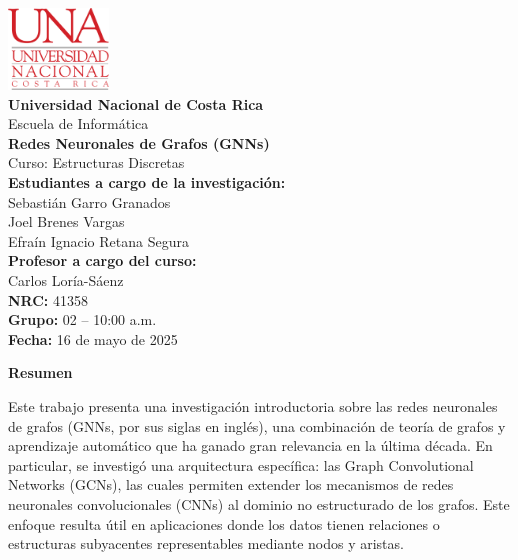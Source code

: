 \documentclass[11pt]{article} %
\begin{document}
\begin{titlepage}
    \thispagestyle{empty}
    \begin{spacing}{1.5}
    \begin{center}
        \includegraphics[width=0.2\textwidth]{Images/LogoUNA.svg.png} \\[30pt]
        {\Large \textbf{Universidad Nacional de Costa Rica}} \\[20pt] 
        {\Large Escuela de Informática} \\[20pt]
        {\Large \textbf{Redes Neuronales de Grafos (GNNs)}} \\[20pt]
        {\Large Curso: Estructuras Discretas} \\[20pt]
        
        {\Large \textbf{Estudiantes a cargo de la investigación:}} \\[10pt]
        {\large Sebastián Garro Granados \\ Joel Brenes Vargas \\ Efraín Ignacio Retana Segura} \\[20pt]
        
        {\Large \textbf{Profesor a cargo del curso:}} \\[10pt]
        {\large Carlos Loría-Sáenz} \\[20pt]
        
        {\Large \textbf{NRC:} 41358} \\[5pt]
        {\Large \textbf{Grupo:} 02 – 10:00 a.m.} \\[100pt]
        
        {\Large \textbf{Fecha:} 16 de mayo de 2025}
    \end{center}
    \end{spacing}
\end{titlepage}
    

\newpage
{\large \textbf{Resumen}}  
\vspace{5pt}

Este trabajo presenta una investigación introductoria sobre las redes neuronales de grafos (GNNs, por sus siglas en inglés), una combinación de teoría de grafos y aprendizaje automático que ha ganado gran relevancia en la última década. En particular, se investigó una arquitectura específica: las Graph Convolutional Networks (GCNs), las cuales permiten extender los mecanismos de redes neuronales convolucionales (CNNs) al dominio no estructurado de los grafos. Este enfoque resulta útil en aplicaciones donde los datos tienen relaciones o estructuras subyacentes representables mediante nodos y aristas.
\end{document}
